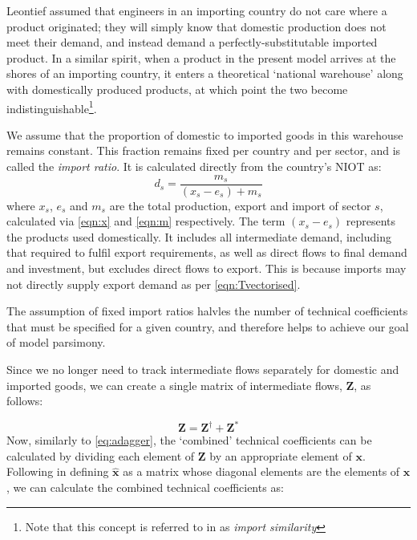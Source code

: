 \documentclass[a4paper]{article}
\begin{document}
Leontief assumed that engineers in an importing country do not care where a product originated; they will simply know that domestic production does not meet their demand, and instead demand a perfectly-substitutable imported product.
In a similar spirit, when a product in the present model arrives at the shores of an importing country, it enters a theoretical `national warehouse' along with domestically produced products, at which point the two become indistinguishable\footnote{Note that this concept is referred to in \textcite{miller_input-output_1985} as \textit{import similarity}}.

We assume that the proportion of domestic to imported goods in this warehouse remains constant.
This fraction remains fixed per country and per sector, and is called the \textit{import ratio}. It is calculated directly from the country's NIOT as:
\begin{equation}\label{eqn:importratio}
d_s = \frac{m_s}{(x_s - e_s ) + m_s}
\end{equation}
where $x_s$, $e_s$ and $m_s$ are the total production, export and import of sector $s$, calculated via \cref{eqn:x} and \cref{eqn:m} respectively.
The term $(x_s - e_s )$ represents the products used domestically.
It includes all intermediate demand, including that required to fulfil export requirements, as well as direct flows to final demand and investment, but excludes direct flows to export.
This is because imports may not directly supply export demand as per \cref{eqn:Tvectorised}.

The assumption of fixed import ratios halvles the number of technical coefficients that must be specified for a given country, and therefore helps to achieve our goal of model parsimony.

Since we no longer need to track intermediate flows separately for domestic and imported goods, we can create a single matrix of intermediate flows, $\boldsymbol{Z}$, as follows:

\begin{equation}
    \boldsymbol{Z} = \boldsymbol{Z}^{\dagger} + \boldsymbol{Z}^{*}
\end{equation}
Now, similarly to \cref{eq:adagger}, the `combined' technical coefficients can be calculated by dividing each element of $\boldsymbol{Z}$ by an appropriate element of $\boldsymbol{x}$.
Following \textcite{miller_input-output_1985} in defining $\boldsymbol{\hat{x}}$ as a matrix whose diagonal elements are the elements of $\boldsymbol{x}$, we can calculate the combined technical coefficients as:
\end{document}
